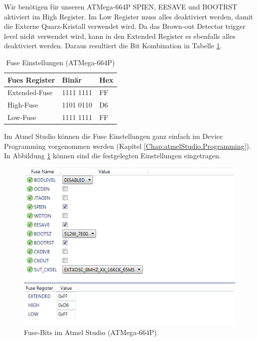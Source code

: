 Wir benötigen für unseren ATMega-664P SPIEN, EESAVE und BOOTRST aktiviert im
High Register. Im Low Register muss alles deaktiviert werden, damit die Externe
Quarz-Kristall verwendet wird. Da das Brown-out Detector trigger level nicht
verwendet wird, kann in den Extended Register es ebenfalls alles deaktiviert
werden. Daraus resultiert die Bit Kombination in Tabelle \ref{fuses-result}.

\begin{table}[H]
\centering
\begin{tabular}{|l|l|l|} \hline
Fues Register & Binär & Hex\\ \hline
Extended-Fuse & 1111 1111 & FF\\ \hline
High-Fuse & 1101 0110 & D6\\ \hline
Low-Fuse & 1111 1111 & FF\\ \hline
\end{tabular}
\caption{Fuse Einstellungen (ATMega-664P)}
\label{fuses-result}
\end{table}

Im Atmel Studio können die Fuse Einstellungen ganz einfach im Device Programming
vorgenommen werden (Kapitel \ref{Chap:atmelStudio.Programming}). In Abbildung
\ref{fuses-graf} können sind die festgelegten Einstellungen eingetragen.

\begin{figure}[h]
\centering
\includegraphics[width=13cm]{content/pictures/Fusebits/fusebits_atmelstudio.png}
\caption{Fuse-Bits im Atmel Studio (ATMega-664P)}
\label{fuses-graf}
\end{figure}

